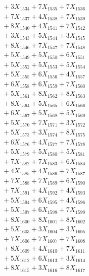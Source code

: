 \documentclass[a4paper,10pt]{article}
\begin{document}
{\begin{align}
&\;  + 3 X_{1534} + 7 X_{1535} + 7 X_{1536} \\[0.3ex]
&\;  + 7 X_{1537} + 4 X_{1538} + 7 X_{1539} \\[0.5ex]\allowbreak
&\;  + 8 X_{1540} + 4 X_{1541} + 7 X_{1542} \\[0.3ex]
&\;  + 3 X_{1543} + 5 X_{1544} + 3 X_{1545} \\[0.3ex]
&\;  + 8 X_{1546} + 7 X_{1547} + 7 X_{1548} \\[0.3ex]
&\;  + 5 X_{1549} + 5 X_{1550} + 6 X_{1551} \\[0.3ex]
&\;  + 5 X_{1552} + 5 X_{1553} + 5 X_{1554} \\[0.3ex]
&\;  + 5 X_{1555} + 6 X_{1556} + 4 X_{1557} \\[0.3ex]
&\;  + 6 X_{1558} + 6 X_{1559} + 7 X_{1560} \\[0.3ex]
&\;  + 5 X_{1561} + 8 X_{1562} + 8 X_{1563} \\[0.3ex]
&\;  + 8 X_{1564} + 5 X_{1565} + 6 X_{1566} \\[0.3ex]
&\;  + 6 X_{1567} + 5 X_{1568} + 5 X_{1569} \\[0.5ex]\allowbreak
&\;  + 5 X_{1570} + 7 X_{1571} + 3 X_{1572} \\[0.3ex]
&\;  + 5 X_{1573} + 3 X_{1574} + 8 X_{1575} \\[0.3ex]
&\;  + 6 X_{1576} + 4 X_{1577} + 7 X_{1578} \\[0.3ex]
&\;  + 5 X_{1579} + 5 X_{1580} + 5 X_{1581} \\[0.3ex]
&\;  + 7 X_{1582} + 7 X_{1583} + 6 X_{1584} \\[0.3ex]
&\;  + 4 X_{1585} + 4 X_{1586} + 7 X_{1587} \\[0.3ex]
&\;  + 7 X_{1588} + 7 X_{1589} + 6 X_{1590} \\[0.3ex]
&\;  + 7 X_{1591} + 4 X_{1592} + 4 X_{1593} \\[0.3ex]
&\;  + 5 X_{1594} + 6 X_{1595} + 4 X_{1596} \\[0.3ex]
&\;  + 5 X_{1597} + 6 X_{1598} + 7 X_{1599} \\[0.5ex]\allowbreak
&\;  + 8 X_{1600} + 8 X_{1601} + 8 X_{1602} \\[0.3ex]
&\;  + 5 X_{1603} + 3 X_{1604} + 3 X_{1605} \\[0.3ex]
&\;  + 7 X_{1606} + 7 X_{1607} + 7 X_{1608} \\[0.3ex]
&\;  + 8 X_{1609} + 4 X_{1610} + 7 X_{1611} \\[0.3ex]
&\;  + 5 X_{1612} + 6 X_{1613} + 3 X_{1614} \\[0.3ex]
&\;  + 8 X_{1615} + 3 X_{1616} + 8 X_{1617} \\[0.3ex]

\end{align}}
\end{document}
